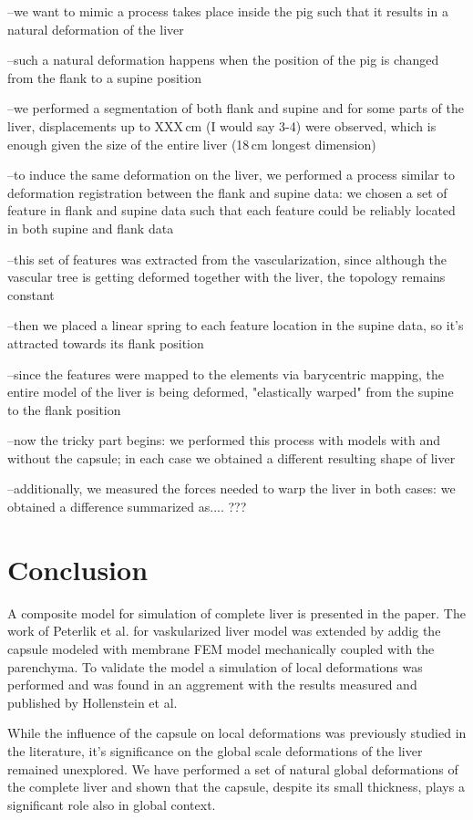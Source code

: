 \documentclass{llncs}
\begin{document}
--we want to mimic a process takes place inside the pig such that it results in a natural deformation of the liver

--such a natural deformation happens when the position of the pig is changed from the flank to a supine position

--we performed a segmentation of both flank and supine and for some parts of the liver, displacements up to XXX\,cm  (I would say 3-4) 
were observed, which is enough given the size of the entire liver (18\,cm longest dimension)

--to induce the same deformation on the liver, we performed a process similar to deformation registration between the flank and supine 
data: we chosen a set of feature in flank and supine data such that each feature could be reliably located in both supine and flank 
data

--this set of features was extracted from the vascularization, since although the vascular tree is getting deformed together with the liver, 
the topology remains constant

--then we placed a linear spring to each feature location in the supine data, so it's attracted towards its flank position

--since the features were mapped to the elements via barycentric mapping, the entire model of the liver is being deformed, "elastically warped" from the 
supine to the flank position


--now the tricky part begins: we performed this process with models with and without the capsule; in each case we obtained 
a different resulting shape of liver

--additionally, we measured the forces needed to warp the liver in both cases: we obtained a difference summarized as.... ???



\section{Conclusion} %

A composite model for simulation of complete liver is presented in the
paper. The work of Peterlik et al. for vaskularized liver model was
extended by addig the capsule modeled with membrane FEM model mechanically
coupled with the parenchyma. To validate the model a simulation of local
deformations was performed and was found in an aggrement with the results
measured and published by Hollenstein et al.

While the influence of the capsule on local deformations was previously
studied in the literature, it's significance on the global scale
deformations of the liver remained unexplored. We have performed a set of
natural global deformations of the complete liver and shown that the
capsule, despite its small thickness, plays a significant role also in
global context.


%
%



\end{document}
